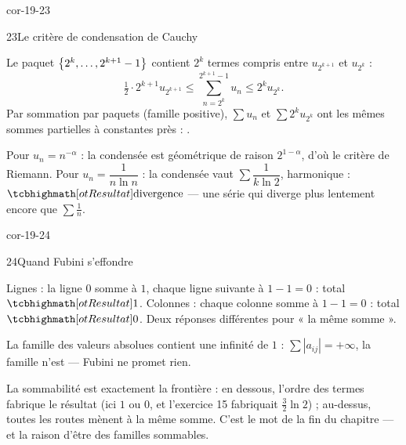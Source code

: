 \begin{blocLivre}{cor-19-23}
\begin{corrige}{23}{Le critère de condensation de Cauchy}
\begin{questions}
  \item Le paquet $\left\{2^{k},\dots,2^{k+1}-1\right\}$ contient $2^{k}$ termes
    compris entre $u_{2^{k+1}}$ et $u_{2^{k}}$ :
    \[
    \tfrac12\cdot2^{k+1}u_{2^{k+1}}\leqslant
    \sum_{n=2^{k}}^{2^{k+1}-1}u_n\leqslant2^{k}u_{2^{k}} .
    \]
    Par sommation par paquets (famille positive), $\sum u_n$ et
    $\sum2^{k}u_{2^{k}}$ ont les mêmes sommes partielles à constantes
    près : .
  \item Pour $u_n=n^{-\alpha}$ : la condensée est géométrique de raison
    $2^{1-\alpha}$, d'où le critère de Riemann. Pour
    $u_n=\dfrac{1}{n\ln n}$ : la condensée vaut
    $\sum\dfrac{1}{k\ln2}$, harmonique : $\res{\text{divergence}}$ — une
    série qui diverge plus lentement encore que $\sum\frac1n$.
\end{questions}
\end{corrige}
\end{blocLivre}

\begin{blocLivre}{cor-19-24}
\begin{corrige}{24}{Quand Fubini s'effondre}
\begin{questions}
  \item Lignes : la ligne $0$ somme à $1$, chaque ligne suivante à
    $1-1=0$ : total $\res{1}$. Colonnes : chaque colonne somme à
    $1-1=0$ : total $\res{0}$. Deux réponses différentes pour « la même
    somme ».
  \item La famille des valeurs absolues contient une infinité de $1$ :
    $\sum|a_{ij}|=+\infty$, la famille n'est  —
    Fubini ne promet rien.
  \item La sommabilité est exactement la frontière : en dessous, l'ordre
    des termes fabrique le résultat (ici $1$ ou $0$, et l'exercice 15
    fabriquait $\frac32\ln2$) ; au-dessus, toutes les routes mènent à la
    même somme. C'est le mot de la fin du chapitre — et la raison d'être
    des familles sommables.
\end{questions}
\end{corrige}
\end{blocLivre}


